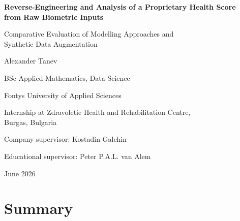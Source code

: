\documentclass[11pt,a4paper]{report}
\begin{document}
\hypersetup{pageanchor=false}
\begin{titlepage}
  \centering
  \vspace*{2cm}
  {\LARGE\bfseries Reverse-Engineering and Analysis of a Proprietary Health Score\\
  from Raw Biometric Inputs\par}
  \vspace{1.5cm}
  {\large Comparative Evaluation of Modelling Approaches and\\
  Synthetic Data Augmentation\par}
  \vspace{2cm}
  {\large Alexander Tanev\par}
  \vspace{0.5cm}
  {\normalsize BSc Applied Mathematics, Data Science\par}
  {\normalsize Fontys University of Applied Sciences\par}
  \vspace{1cm}
  {\normalsize Internship at Zdravoletie Health and Rehabilitation Centre,\\
  Burgas, Bulgaria\par}
  \vspace{1cm}
  {\normalsize Company supervisor: Kostadin Galchin\par}
  {\normalsize Educational supervisor: Peter P.A.L. van Alem\par}
  \vspace{2cm}
  {\normalsize June 2026\par}
  \vfill
\end{titlepage}
\hypersetup{pageanchor=true}

\tableofcontents
\newpage

\listoffigures
\newpage

\listoftables
\newpage

\chapter{Summary}
\end{document}

